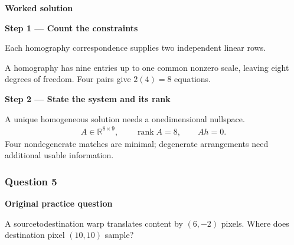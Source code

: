\documentclass[letterpaper,11pt,english,openany,oneside]{jupyterBook}
\begin{document}
\par\medskip
\textbf{Worked solution}\par\smallskip

\par\medskip{}
{\color{QuizStepRed}\bfseries Step 1 — Count the constraints}\par\smallskip

\sphinxAtStartPar
{} Each homography correspondence supplies two independent linear rows.

\sphinxAtStartPar
A homography has nine entries up to one common nonzero scale, leaving eight degrees of freedom. Four pairs give {\color{QuizMathBlue} \(2(4)=8\)} equations.

\par

\par\medskip{}
{\color{QuizStepRed}\bfseries Step 2 — State the system and its rank}\par\smallskip

\sphinxAtStartPar
{} A unique homogeneous solution needs a one\sphinxhyphen{}dimensional nullspace.
{\color{QuizMathBlue} \begin{equation*}
\begin{split}
A\in\mathbb R^{8\times9},\qquad \operatorname{rank}A=8,\qquad Ah=0.
\end{split}
\end{equation*}}
\sphinxAtStartPar
Four nondegenerate matches are minimal; degenerate arrangements need additional usable information.

\par

\par\medskip


\subsubsection{Question 5}
\label{\detokenize{lectures/lecture02/tldr:question-5}}\label{\detokenize{lectures/lecture02/tldr:lec02-tldr-q5}}
\par\medskip\textbf{Original practice question}\par\smallskip

\sphinxAtStartPar
A source\sphinxhyphen{}to\sphinxhyphen{}destination warp translates content by \((6,-2)\) pixels. Where does destination pixel \((10,10)\) sample?

\par\medskip
\end{document}
